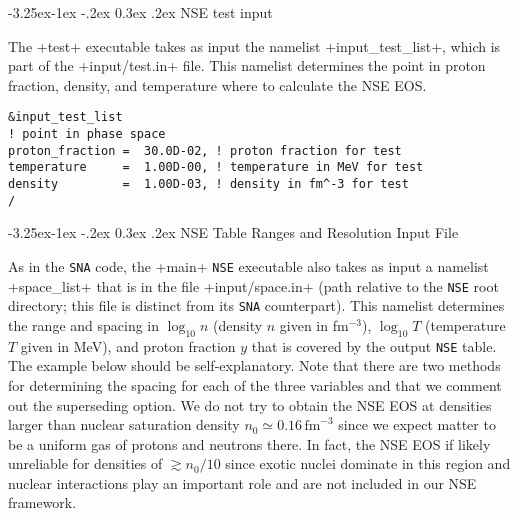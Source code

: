 \documentclass[letterpaper,11pt]{refart}
\makeatletter
\renewcommand\subsubsection{\@startsection{subsubsection}{3}{\z@}%
                           {-3.25ex\@plus -1ex \@minus -.2ex}%
                           {0.3ex \@plus .2ex}%
                           {\normalfont\normalsize\bf\fontsize{11}{13}\selectfont}}
\makeatother
\begin{document}
\subsubsection{NSE test input}\label{sssec:NSE_test_in}


The \verbexec+test+ executable takes as input the namelist
\verbnml+input_test_list+, which is part of the
\verbfile+input/test.in+ file.  This namelist determines the point in
proton fraction, density, and temperature where to calculate the NSE
EOS.

{\color{cyan}
\begin{verbatim}
&input_test_list
! point in phase space
proton_fraction =  30.0D-02, ! proton fraction for test
temperature     =  1.00D-00, ! temperature in MeV for test
density         =  1.00D-03, ! density in fm^-3 for test
/
\end{verbatim}}



\subsubsection{NSE Table Ranges and Resolution Input File}\label{sssec:NSE_phase_space_in}


As in the \texttt{SNA} code, the \verbexec+main+ \texttt{NSE}
executable also takes as input a namelist
\verbnml+space_list+ that is in the file
\verbfile+input/space.in+ (path relative to the \texttt{NSE} root directory; 
this file is distinct from its \texttt{SNA} counterpart).  This namelist
determines the range and spacing in $\log_{10}n$ (density $n$ given in
fm$^{-3}$), $\log_{10}T$ (temperature $T$ given in MeV), and proton
fraction $y$ that is covered by the output \texttt{NSE} table. The
example below should be self-explanatory.  Note that there are two
methods for determining the spacing for each of the three variables
and that we comment out the superseding option.  We do not try to
obtain the NSE EOS at densities larger than nuclear saturation density
$n_0\simeq0.16\,\mathrm{fm}^{-3}$ since we expect matter to be a
uniform gas of protons and neutrons there.  In fact, the NSE EOS if
likely unreliable for densities of $\gtrsim n_0/10$ since exotic
nuclei dominate in this region and nuclear interactions play an
important role and are not included in our NSE framework.
\end{document}
